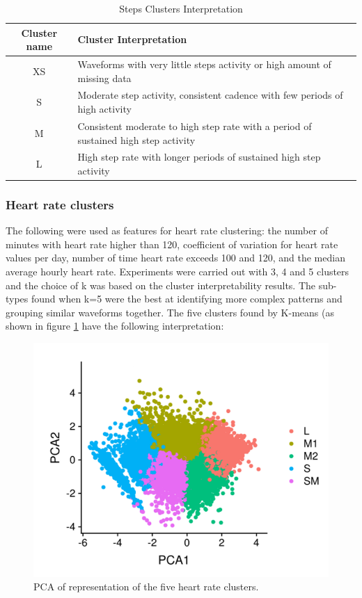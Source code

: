 \documentclass{article}
\begin{document}
\begin{table}[H]
  \caption{Steps Clusters Interpretation}
  \label{steps_inter}
  \centering
  \begin{tabular}{ c|l }
    \toprule
    \cmidrule(r){1-2}
    Cluster name & Cluster Interpretation \\
    \hline
    XS & Waveforms with very little steps activity or high amount of missing data \\
    \hline
    S & Moderate step activity, consistent cadence with few periods of high activity\\
    \hline
    M & Consistent moderate to high step rate with a period of sustained high step activity \\
    \hline
    L & High step rate with longer periods of sustained high step activity \\
    \bottomrule
    \end{tabular}
\end{table}

\subsubsection{Heart rate clusters}

The following were used as features for heart rate clustering: the number of minutes with heart rate higher than 120, coefficient of variation for heart rate values per day, number of time heart rate exceeds 100 and 120, and the median average hourly heart rate. Experiments were carried out with 3, 4 and 5 clusters and the choice of k was based on the cluster interpretability results. The sub-types found when k=5 were the best at identifying more complex patterns and grouping similar waveforms together. 
The five clusters found by K-means (as shown in figure \ref{fig:HRclusters} have the following interpretation: 

\begin{figure}[!htb]
  \centering
  \includegraphics[]{HRclusters.png}
  \caption{PCA of representation of the five heart rate clusters. }
  \label{fig:HRclusters}
\end{figure}
\end{document}
